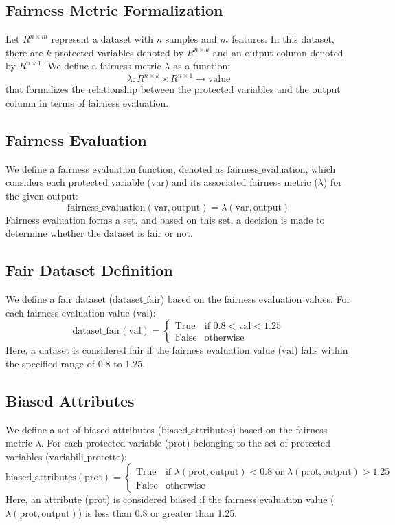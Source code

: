 \documentclass{article}
\begin{document}
\subsection{Fairness Metric Formalization}
Let \( R^{n \times m} \) represent a dataset with \( n \) samples and \( m \) features. In this dataset, there are \( k \) protected variables denoted by \( R^{n \times k} \) and an output column denoted by \( R^{n \times 1} \). We define a fairness metric \( \lambda \) as a function:
\[ \lambda: R^{n \times k} \times R^{n \times 1} \rightarrow \text{value} \]
that formalizes the relationship between the protected variables and the output column in terms of fairness evaluation.

\subsection{Fairness Evaluation}
We define a fairness evaluation function, denoted as \( \text{fairness\_evaluation} \), which considers each protected variable (\( \text{var} \)) and its associated fairness metric (\( \lambda \)) for the given output:
\[ \text{fairness\_evaluation}(\text{var}, \text{output}) = \lambda(\text{var}, \text{output}) \]
Fairness evaluation forms a set, and based on this set, a decision is made to determine whether the dataset is fair or not.

\subsection{Fair Dataset Definition}
We define a fair dataset (\( \text{dataset\_fair} \)) based on the fairness evaluation values. For each fairness evaluation value (\( \text{val} \)):
\[ \text{dataset\_fair}(\text{val}) = \begin{cases} 
      \text{True} & \text{if } 0.8 < \text{val} < 1.25 \\
      \text{False} & \text{otherwise}
   \end{cases}
\]
Here, a dataset is considered fair if the fairness evaluation value (\( \text{val} \)) falls within the specified range of 0.8 to 1.25.

\subsection{Biased Attributes}
We define a set of biased attributes (\( \text{biased\_attributes} \)) based on the fairness metric \( \lambda \). For each protected variable (\( \text{prot} \)) belonging to the set of protected variables (\( \text{variabili\_protette} \)):
\[ \text{biased\_attributes}(\text{prot}) = \begin{cases} 
      \text{True} & \text{if } \lambda(\text{prot}, \text{output}) < 0.8 \text{ or } \lambda(\text{prot}, \text{output}) > 1.25 \\
      \text{False} & \text{otherwise}
   \end{cases}
\]
Here, an attribute (\( \text{prot} \)) is considered biased if the fairness evaluation value (\( \lambda(\text{prot}, \text{output}) \)) is less than 0.8 or greater than 1.25.
\end{document}
